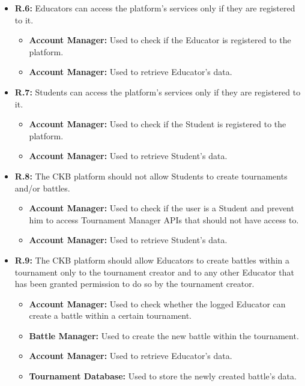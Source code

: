 \documentclass{article}
\begin{document}
{\begin{itemize}
\begin{itemize}
          \end{itemize}
    \item \textbf{R.6:} Educators can access the platform's services only if they are registered to it.
          \begin{itemize}
              \item \textbf{Account Manager:} Used to check if the Educator is registered to
              the platform.
              \item \textbf{Account Manager:} Used to retrieve Educator's data.
          \end{itemize}
    \item \textbf{R.7:} Students can access the platform's services only if they are registered to it.
          \begin{itemize}
            \item \textbf{Account Manager:} Used to check if the Student is registered to
            the platform.
            \item \textbf{Account Manager:} Used to retrieve Student's data.
          \end{itemize}
    \item \textbf{R.8:} The CKB platform should not allow Students to create tournaments and/or battles.
          \begin{itemize}
              \item \textbf{Account Manager:} Used to check if the user is a Student and prevent him
              to access Tournament Manager APIs that should not have access to.
              \item \textbf{Account Manager:} Used to retrieve Student's data.
          \end{itemize}
    \item \textbf{R.9:} The CKB platform should allow Educators to create battles within a tournament only to the tournament
          creator and to any other Educator that has been granted permission to do so by the tournament creator.
          \begin{itemize}
              \item \textbf{Account Manager:} Used to check whether the logged Educator can create
              a battle within a certain tournament.
              \item \textbf{Battle Manager:} Used to create the new battle within the tournament.
              \item \textbf{Account Manager:} Used to retrieve Educator's data. 
              \item \textbf{Tournament Database:} Used to store the newly created battle's data.

\end{itemize}
\end{itemize}}
\end{document}
